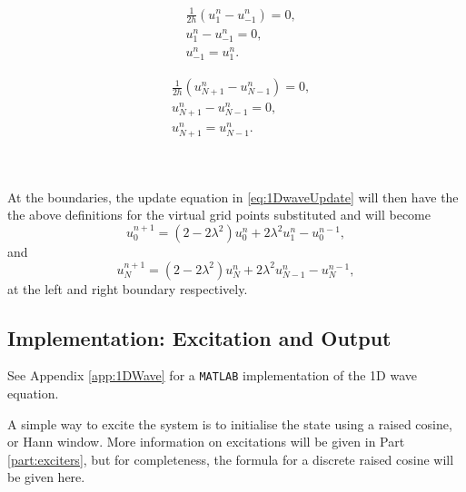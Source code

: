 \begin{minipage}[c]{0.49\textwidth}
    \begin{align*}
        &\frac{1}{2h} \left(u_1^n - u_{-1}^n\right) = 0,\\
        &u_1^n - u_{-1}^n = 0,\\
        &u_{-1}^n = u_1^n.
    \end{align*}
\end{minipage}
\begin{minipage}[c]{0.49\textwidth}
    \begin{align*}
        &\frac{1}{2h} \left(u_{N+1}^n - u_{N-1}^n\right) = 0,\\
        &u_{N+1}^n - u_{N-1}^n = 0,\\
        &u_{N+1}^n = u_{N-1}^n.
    \end{align*}
\end{minipage}
\\
\\
\noindent At the boundaries, the update equation in \eqref{eq:1DwaveUpdate} will then have the the above definitions for the virtual grid points substituted and will become 
\begin{equation}\label{eq:1DWaveLeftBound}
    u_0^{n+1} = \left(2-2\lambda^2\right) u_0^n  + 2\lambda^2 u_1^n - u_0^{n-1},
\end{equation}
and 
\begin{equation}\label{eq:1DWaveRightBound}
    u_N^{n+1} = \left(2-2\lambda^2\right) u_N^n  + 2\lambda^2 u_{N-1}^n - u_N^{n-1},
\end{equation}
at the left and right boundary respectively.

\subsection{Implementation: Excitation and Output}\label{sec:output1DWave}
See Appendix \ref{app:1DWave} for a \texttt{MATLAB} implementation of the 1D wave equation.

A simple way to excite the system is to initialise the state using a raised cosine, or Hann window. More information on excitations will be given in Part \ref{part:exciters}, but for completeness, the formula for a discrete raised cosine will be given here. 

